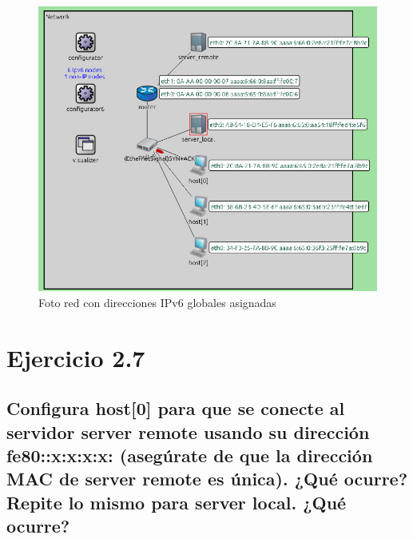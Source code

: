 \begin{figure}[H]
    \centering
    \includegraphics[width=135mm, scale=0.75]{imaxes/captura_ejer2_6.png}
    \caption{Foto red con direcciones IPv6 globales asignadas}
    \label{fig:ip_global_host0}
\end{figure}

\section{Ejercicio 2.7}
\subsection{Configura host[0] para que se conecte al servidor server remote usando su dirección fe80::x:x:x:x:
(asegúrate de que la dirección MAC de server remote es única). ¿Qué ocurre? Repite lo mismo para
server local. ¿Qué ocurre?}